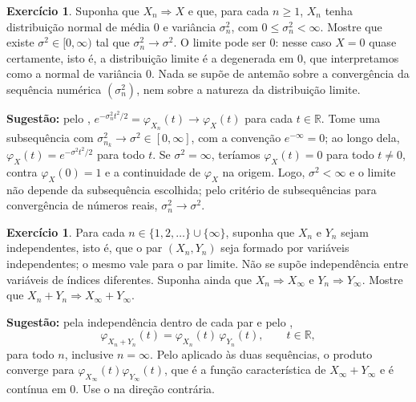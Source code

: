 \documentclass[12pt,portuguese]{article}
\theoremstyle{definition}
\theoremstyle{plainexercise}
\theoremstyle{starredexercise}
\newtheorem{starredexercise}[exercise]{Exercício}
\theoremstyle{definition}
\begin{document}
\begin{starredexercise}\label{exercise:normal-variancia}
Suponha que $X_n\Rightarrow X$ e que, para cada $n\geqslant1$, $X_n$ tenha
distribuição normal de média $0$ e variância $\sigma_n^2$, com
$0\leqslant\sigma_n^2<\infty$. Mostre que existe $\sigma^2\in[0,\infty)$ tal que
$\sigma_n^2\to\sigma^2$. O limite pode ser $0$: nesse caso $X=0$ quase
certamente, isto é, a distribuição limite é a degenerada em $0$, que
interpretamos como a normal de variância $0$. Nada se supõe de antemão sobre a
convergência da sequência numérica
$(\sigma_n^2)$, nem sobre a natureza da distribuição limite.

\noindent\textbf{Sugestão:} pelo ,
$e^{-\sigma_n^2t^2/2}=\varphi_{X_n}(t)\to\varphi_X(t)$ para cada
$t\in\mathbb{R}$. Tome uma subsequência com
$\sigma_{n_k}^2\to\sigma^2\in[0,\infty]$, com a convenção $e^{-\infty}=0$; ao
longo dela, $\varphi_X(t)=e^{-\sigma^2t^2/2}$ para todo $t$. Se
$\sigma^2=\infty$, teríamos $\varphi_X(t)=0$ para todo $t\neq0$, contra
$\varphi_X(0)=1$ e a continuidade de $\varphi_X$ na origem. Logo,
$\sigma^2<\infty$ e o limite não depende da subsequência escolhida; pelo
critério de subsequências para convergência de números reais,
$\sigma_n^2\to\sigma^2$.
\end{starredexercise}

\begin{starredexercise}\label{exercise:soma-independentes-convergencia}
Para cada $n\in\{1,2,\dots\}\cup\{\infty\}$, suponha que $X_n$ e $Y_n$ sejam
independentes, isto é, que o par $(X_n,Y_n)$ seja formado por variáveis
independentes; o mesmo vale para o par limite. Não se supõe independência entre
variáveis de índices diferentes. Suponha ainda que $X_n\Rightarrow X_\infty$ e
$Y_n\Rightarrow Y_\infty$. Mostre que
$X_n+Y_n\Rightarrow X_\infty+Y_\infty$.

\noindent\textbf{Sugestão:} pela independência dentro de cada par e pelo
,
\[
\varphi_{X_n+Y_n}(t)=\varphi_{X_n}(t)\,\varphi_{Y_n}(t),
\qquad t\in\mathbb{R},
\]
para todo $n$, inclusive $n=\infty$. Pelo  aplicado às
duas sequências, o produto converge para $\varphi_{X_\infty}(t)\varphi_{Y_\infty}(t)$,
que é a função característica de $X_\infty+Y_\infty$ e é contínua em $0$. Use
o  na direção contrária.
\end{starredexercise}
\end{document}
